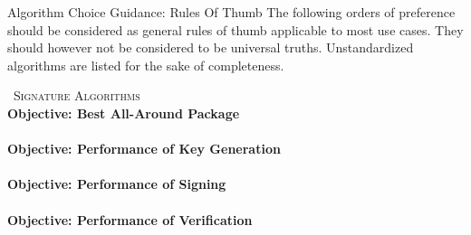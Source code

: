 \documentclass[11pt,english,a4paper, landscape]{scrartcl}
\begin{document}
	\begin{minipage}[t]{0.7\textwidth}
		\vspace{0pt}
		\begin{algorithmbox}{Algorithm Choice Guidance: Rules Of Thumb}
			{\scriptsize The following orders of preference should be considered as general rules of thumb applicable to most use cases. They should however not be considered to be universal truths. Unstandardized algorithms are listed for the sake of completeness.\\}
			\begin{minipage}[t]{0.5\textwidth}
				\vspace{0pt}
				{\scshape \faPen\, Signature Algorithms}\\
				{\scriptsize \bfseries Objective: Best All-Around Package \tbv}\\[0.1\baselineskip]
				\\[0.75\baselineskip]
				{\scriptsize \bfseries Objective: Performance of Key Generation \tbv}\\[0.1\baselineskip]
				\\[0.75\baselineskip]
				{\scriptsize \bfseries Objective: Performance of Signing \tbv}\\[0.1\baselineskip]
				\\[0.75\baselineskip]
				{\scriptsize \bfseries Objective: Performance of Verification \tbv}\\[0.1\baselineskip]
				\\[0.75\baselineskip]

\end{minipage}
\end{algorithmbox}
\end{minipage}
\end{document}
